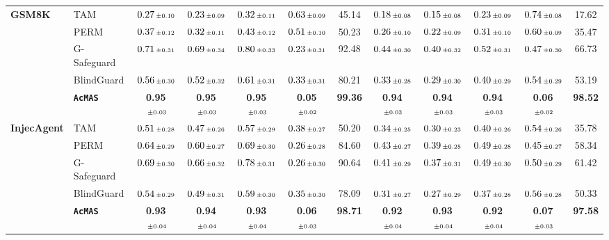 \documentclass{article}
\newcommand{\pmstd}[1]{\text{{\fontsize{6}{6}\selectfont$\pm #1$}}}
\newcommand{\app}{\texttt{AcMAS}}
\theoremstyle{plain}
\theoremstyle{definition}
\theoremstyle{remark}
\begin{document}
\begin{table}[h]
{\begin{tabular}{l | l | ccccc | ccccc}
\multirow{5}{*}{\textbf{GSM8K}}
& TAM
& $0.27\,\pmstd{0.10}$ & $0.23\,\pmstd{0.09}$ & $0.32\,\pmstd{0.11}$ & $0.63\,\pmstd{0.09}$ & 45.14
& $0.18\,\pmstd{0.08}$ & $0.15\,\pmstd{0.08}$ & $0.23\,\pmstd{0.09}$ & $0.74\,\pmstd{0.08}$ & 17.62 \\
& PERM
& $0.37\,\pmstd{0.12}$ & $0.32\,\pmstd{0.11}$ & $0.43\,\pmstd{0.12}$ & $0.51\,\pmstd{0.10}$ & 50.23
& $0.26\,\pmstd{0.10}$ & $0.22\,\pmstd{0.09}$ & $0.31\,\pmstd{0.10}$ & $0.60\,\pmstd{0.09}$ & 35.47 \\
& G-Safeguard
& $0.71\,\pmstd{0.31}$ & $0.69\,\pmstd{0.34}$ & $0.80\,\pmstd{0.33}$ & $0.23\,\pmstd{0.31}$ & 92.48
& $0.44\,\pmstd{0.30}$ & $0.40\,\pmstd{0.32}$ & $0.52\,\pmstd{0.31}$ & $0.47\,\pmstd{0.30}$ & 66.73 \\
& BlindGuard
& $0.56\,\pmstd{0.30}$ & $0.52\,\pmstd{0.32}$ & $0.61\,\pmstd{0.31}$ & $0.33\,\pmstd{0.31}$ & 80.21
& $0.33\,\pmstd{0.28}$ & $0.29\,\pmstd{0.30}$ & $0.40\,\pmstd{0.29}$ & $0.54\,\pmstd{0.29}$ & 53.19 \\
& \textbf{\app{}}
& \textbf{0.95}$\,\pmstd{0.03}$ & \textbf{0.95}$\,\pmstd{0.03}$ & \textbf{0.95}$\,\pmstd{0.03}$ & \textbf{0.05}$\,\pmstd{0.02}$ & \textbf{99.36}
& \textbf{0.94}$\,\pmstd{0.03}$ & \textbf{0.94}$\,\pmstd{0.03}$ & \textbf{0.94}$\,\pmstd{0.03}$ & \textbf{0.06}$\,\pmstd{0.02}$ & \textbf{98.52} \\
\midrule

\multirow{5}{*}{\textbf{InjecAgent}}
& TAM
& $0.51\,\pmstd{0.28}$ & $0.47\,\pmstd{0.26}$ & $0.57\,\pmstd{0.29}$ & $0.38\,\pmstd{0.27}$ & 50.20
& $0.34\,\pmstd{0.25}$ & $0.30\,\pmstd{0.23}$ & $0.40\,\pmstd{0.26}$ & $0.54\,\pmstd{0.26}$ & 35.78 \\
& PERM
& $0.64\,\pmstd{0.29}$ & $0.60\,\pmstd{0.27}$ & $0.69\,\pmstd{0.30}$ & $0.26\,\pmstd{0.28}$ & 84.60
& $0.43\,\pmstd{0.27}$ & $0.39\,\pmstd{0.25}$ & $0.49\,\pmstd{0.28}$ & $0.45\,\pmstd{0.27}$ & 58.34 \\
& G-Safeguard
& $0.69\,\pmstd{0.30}$ & $0.66\,\pmstd{0.32}$ & $0.78\,\pmstd{0.31}$ & $0.26\,\pmstd{0.30}$ & 90.64
& $0.41\,\pmstd{0.29}$ & $0.37\,\pmstd{0.31}$ & $0.49\,\pmstd{0.30}$ & $0.50\,\pmstd{0.29}$ & 61.42 \\
& BlindGuard
& $0.54\,\pmstd{0.29}$ & $0.49\,\pmstd{0.31}$ & $0.59\,\pmstd{0.30}$ & $0.35\,\pmstd{0.30}$ & 78.09
& $0.31\,\pmstd{0.27}$ & $0.27\,\pmstd{0.29}$ & $0.37\,\pmstd{0.28}$ & $0.56\,\pmstd{0.28}$ & 50.33 \\
& \textbf{\app{}}
& \textbf{0.93}$\,\pmstd{0.04}$ & \textbf{0.94}$\,\pmstd{0.04}$ & \textbf{0.93}$\,\pmstd{0.04}$ & \textbf{0.06}$\,\pmstd{0.03}$ & \textbf{98.71}
& \textbf{0.92}$\,\pmstd{0.04}$ & \textbf{0.93}$\,\pmstd{0.04}$ & \textbf{0.92}$\,\pmstd{0.04}$ & \textbf{0.07}$\,\pmstd{0.03}$ & \textbf{97.58} \\
\midrule


\end{tabular}}
\end{table}
\end{document}
